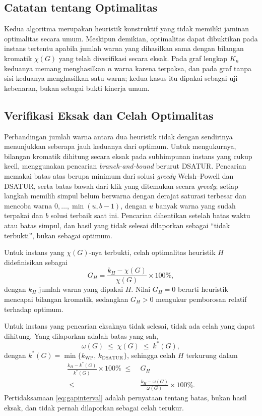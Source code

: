 \documentclass[conference,a4paper]{IEEEtran}
\newcommand{\WP}{\mathrm{WP}}
\newcommand{\DS}{\mathrm{DSATUR}}
\begin{document}
\subsection{Catatan tentang Optimalitas}
Kedua algoritma merupakan heuristik konstruktif yang tidak memiliki jaminan
optimalitas secara umum. Meskipun demikian, optimalitas dapat dibuktikan pada
instans tertentu apabila jumlah warna yang dihasilkan sama dengan bilangan
kromatik $\chi(G)$ yang telah diverifikasi secara eksak. Pada graf lengkap
$K_n$ keduanya memang menghasilkan $n$
warna karena terpaksa, dan pada graf tanpa sisi keduanya menghasilkan satu
warna; kedua kasus itu dipakai sebagai uji kebenaran, bukan sebagai bukti
kinerja umum.

\subsection{Verifikasi Eksak dan Celah Optimalitas}
Perbandingan jumlah warna antara dua heuristik tidak dengan sendirinya
menunjukkan seberapa jauh keduanya dari optimum. Untuk mengukurnya, bilangan
kromatik dihitung secara eksak pada subhimpunan instans yang cukup kecil,
menggunakan pencarian \emph{branch-and-bound} berurut DSATUR. Pencarian memakai
batas atas berupa minimum dari solusi \emph{greedy} Welsh--Powell dan DSATUR,
serta batas bawah dari klik yang ditemukan secara \emph{greedy}; setiap langkah
memilih simpul belum berwarna dengan
derajat saturasi terbesar dan mencoba warna $0,\dots,\min(u,b-1)$, dengan $u$
banyak warna yang sudah terpakai dan $b$ solusi terbaik saat ini. Pencarian
dihentikan setelah batas waktu atau batas simpul, dan hasil yang tidak selesai
dilaporkan sebagai ``tidak terbukti'', bukan sebagai optimum.

Untuk instans yang $\chi(G)$-nya terbukti, celah optimalitas heuristik $H$
didefinisikan sebagai
\begin{equation}
G_H=\frac{k_H-\chi(G)}{\chi(G)}\times 100\%,
\label{eq:gap}
\end{equation}
dengan $k_H$ jumlah warna yang dipakai $H$. Nilai $G_H=0$ berarti heuristik
mencapai bilangan kromatik, sedangkan $G_H>0$ mengukur pemborosan relatif
terhadap optimum.

Untuk instans yang pencarian eksaknya tidak selesai, tidak ada celah yang dapat
dihitung. Yang dilaporkan adalah batas yang sah,
\begin{equation}
\omega(G)\;\le\;\chi(G)\;\le\;k^{*}(G),
\label{eq:gapbounds}
\end{equation}
dengan $k^{*}(G)=\min\{k_{\WP},\,k_{\DS}\}$, sehingga celah $H$ terkurung dalam
\begin{equation}
\begin{aligned}
\frac{k_H-k^{*}(G)}{k^{*}(G)}\times100\%
\;\le\;&G_H\\
\;\le\;&\frac{k_H-\omega(G)}{\omega(G)}\times100\% .
\end{aligned}
\label{eq:gapinterval}
\end{equation}
Pertidaksamaan \eqref{eq:gapinterval} adalah pernyataan tentang batas, bukan
hasil eksak, dan tidak pernah dilaporkan sebagai celah terukur.
\end{document}
